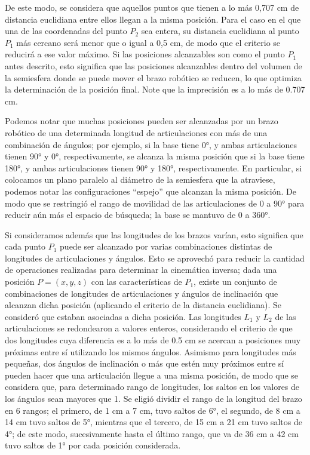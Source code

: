 De este modo, se considera que aquellos puntos que tienen a lo más 0,707 cm de distancia euclidiana entre ellos llegan a la misma posición. Para el caso en el que una de las coordenadas del punto $P_2$ sea entera, su distancia euclidiana al punto $P_1$ más cercano será menor que o igual a 0,5 cm, de modo que el criterio se reducirá a ese valor máximo. Si las posiciones alcanzables son como el punto $P_1$ antes descrito, esto significa que las posiciones alcanzables dentro del volumen de la semiesfera donde se puede mover el brazo robótico se reducen, lo que optimiza la determinación de la posición final. Note que la imprecisión es a lo más de 0.707 cm. 

Podemos notar que muchas posiciones pueden ser alcanzadas por un brazo robótico de una determinada longitud de articulaciones con más de una combinación de ángulos; por ejemplo, si la base tiene 0°, y ambas articulaciones tienen 90° y 0°, respectivamente, se alcanza la misma posición que si la base tiene 180°, y ambas articulaciones tienen 90° y 180°, respectivamente. En particular, si colocamos un plano paralelo al diámetro de la semiesfera que la atraviese, podemos notar las configuraciones ``espejo'' que alcanzan la misma posición. De modo que se restringió el rango de movilidad de las articulaciones de 0 a 90° para reducir aún más el espacio de búsqueda; la base se mantuvo de 0 a 360°. 

Si consideramos además que las longitudes de los brazos varían, esto significa que cada punto $P_1$ puede ser alcanzado por varias combinaciones distintas de longitudes de articulaciones y ángulos. Esto se aprovechó para reducir la cantidad de operaciones realizadas para determinar la cinemática inversa; dada una posición $P = (x,y,z)$ con las características de $P_1$, existe un conjunto de combinaciones de longitudes de articulaciones y ángulos de inclinación que alcanzan dicha posición (aplicando el criterio de la distancia euclidiana). Se consideró que estaban asociadas a dicha posición. Las longitudes $L_1$ y $L_2$ de las articulaciones se redondearon a valores enteros, considerando el criterio de que dos longitudes cuya diferencia es a lo más de 0.5 cm se acercan a posiciones muy próximas entre sí utilizando los mismos ángulos. Asimismo para longitudes más pequeñas, dos ángulos de inclinación o más que estén muy próximos entre sí pueden hacer que una articulación llegue a una misma posición, de modo que se considera que, para determinado rango de longitudes, los saltos en los valores de los ángulos sean mayores que 1. Se eligió dividir el rango de la longitud del brazo en 6 rangos; el primero, de 1 cm a 7 cm, tuvo saltos de 6°, el segundo, de 8 cm a 14 cm tuvo saltos de 5°, mientras que el tercero, de 15 cm a 21 cm tuvo saltos de 4°; de este modo, sucesivamente hasta el último rango, que va de 36 cm a 42 cm tuvo saltos de 1° por cada posición considerada.

